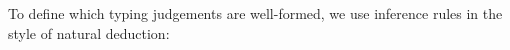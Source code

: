 \documentclass[]{unswthesis}
\newcommand{\types}{\vdash}
\let\c\texttt
\let\i\textit
\let\b\textbf
\begin{document}
To define which typing judgements are well-formed, we use inference rules in the style of natural deduction:






\end{document}
